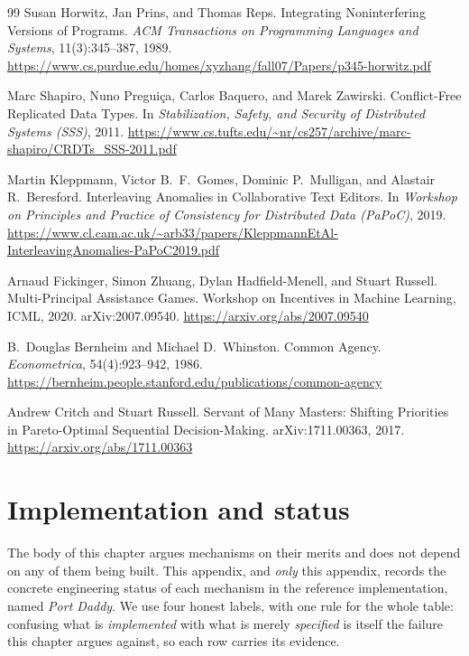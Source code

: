 \documentclass[11pt,a4paper]{article}
\theoremstyle{definition}
\theoremstyle{plain}
\begin{document}
\begin{thebibliography}{99}
Susan Horwitz, Jan Prins, and Thomas Reps.
\newblock Integrating Noninterfering Versions of Programs.
\newblock \textit{ACM Transactions on Programming Languages and Systems}, 11(3):345--387, 1989.
\newblock \url{https://www.cs.purdue.edu/homes/xyzhang/fall07/Papers/p345-horwitz.pdf}

Marc Shapiro, Nuno Pregui\c{c}a, Carlos Baquero, and Marek Zawirski.
\newblock Conflict-Free Replicated Data Types.
\newblock In \textit{Stabilization, Safety, and Security of Distributed Systems (SSS)}, 2011.
\newblock \url{https://www.cs.tufts.edu/~nr/cs257/archive/marc-shapiro/CRDTs_SSS-2011.pdf}

Martin Kleppmann, Victor B.\ F.\ Gomes, Dominic P.\ Mulligan, and Alastair R.\ Beresford.
\newblock Interleaving Anomalies in Collaborative Text Editors.
\newblock In \textit{Workshop on Principles and Practice of Consistency for Distributed Data (PaPoC)}, 2019.
\newblock \url{https://www.cl.cam.ac.uk/~arb33/papers/KleppmannEtAl-InterleavingAnomalies-PaPoC2019.pdf}

Arnaud Fickinger, Simon Zhuang, Dylan Hadfield-Menell, and Stuart Russell.
\newblock Multi-Principal Assistance Games.
\newblock Workshop on Incentives in Machine Learning, ICML, 2020. arXiv:2007.09540. \url{https://arxiv.org/abs/2007.09540}

B.\ Douglas Bernheim and Michael D.\ Whinston.
\newblock Common Agency.
\newblock \textit{Econometrica}, 54(4):923--942, 1986.
\newblock \url{https://bernheim.people.stanford.edu/publications/common-agency}

Andrew Critch and Stuart Russell.
\newblock Servant of Many Masters: Shifting Priorities in Pareto-Optimal Sequential Decision-Making.
\newblock arXiv:1711.00363, 2017. \url{https://arxiv.org/abs/1711.00363}
\end{thebibliography}

\appendix

\section{Implementation and status}\label{app:honest}

The body of this chapter argues mechanisms on their merits and does not depend on any of
them being built. This appendix, and \emph{only} this appendix, records the
concrete engineering status of each mechanism in the reference implementation, named
\emph{Port Daddy}. We use four honest labels, with one rule for the whole table:
confusing what is \emph{implemented} with what is merely \emph{specified} is itself
the failure this chapter argues against, so each row carries its evidence.
\end{document}
